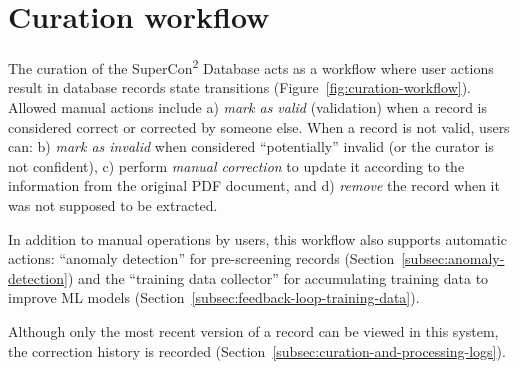 \section{Curation workflow}
\label{sec:curation-workflow}
The curation of the SuperCon\textsuperscript{2} Database acts as a workflow where user actions result in database records state transitions (Figure~\ref{fig:curation-workflow}). 
Allowed manual actions include a) \textit{mark as valid} (validation) when a record is considered correct or corrected by someone else. When a record is not valid, users can: b) \textit{mark as invalid} when considered ``potentially'' invalid (or the curator is not confident), c) perform \textit{manual correction} to update it according to the information from the original PDF document, and d) \textit{remove} the record when it was not supposed to be extracted.

In addition to manual operations by users, this workflow also supports automatic actions: ``anomaly detection'' for pre-screening records (Section~\ref{subsec:anomaly-detection}) and the ``training data collector'' for accumulating training data to improve ML models (Section~\ref{subsec:feedback-loop-training-data}). 


Although only the most recent version of a record can be viewed in this system, the correction history is recorded (Section~\ref{subsec:curation-and-processing-logs}). 


